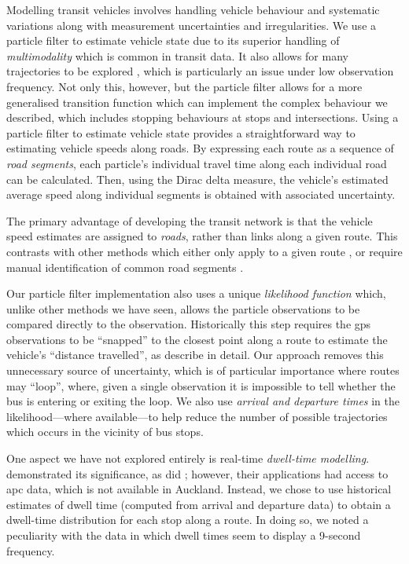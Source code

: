 Modelling transit vehicles involves handling vehicle behaviour and systematic variations along with measurement uncertainties and irregularities. We use a particle filter to estimate vehicle state due to its superior handling of \emph{multimodality} which is common in transit data. It also allows for many trajectories to be explored \citep{Hans_2015}, which is particularly an issue under low observation frequency. Not only this, however, but the particle filter allows for a more generalised transition function which can implement the complex behaviour we described, which includes stopping behaviours at stops and intersections. Using a particle filter to estimate vehicle state provides a straightforward way to estimating vehicle speeds along roads. By expressing each route as a sequence of \emph{road segments}, each particle's individual travel time along each individual road can be calculated. Then, using the Dirac delta measure, the vehicle's estimated average speed along individual segments is obtained with associated uncertainty.


The primary advantage of developing the transit network is that the vehicle speed estimates are assigned to \emph{roads}, rather than links along a given route. This contrasts with other methods which either only apply to a given route \citep{Yu_2010,Celan_2017,Chang_2010}, or require manual identification of common road segments \citep{Yu_2011,Yin_2017}.


Our particle filter implementation also uses a unique \emph{likelihood function} which, unlike other methods we have seen, allows the particle observations to be compared directly to the observation. Historically this step requires the \gls{gps} observations to be ``snapped'' to the closest point along a route to estimate the vehicle's ``distance travelled'', as \citet{Cathey_2003} describe in detail. Our approach removes this unnecessary source of uncertainty, which is of particular importance where routes may ``loop'', where, given a single observation it is impossible to tell whether the bus is entering or exiting the loop. We also use \emph{arrival and departure times} in the likelihood---where available---to help reduce the number of possible trajectories which occurs in the vicinity of bus stops.


One aspect we have not explored entirely is real-time \emph{dwell-time modelling}. \citet{Shalaby_2004} demonstrated its significance, as did \citet{Hans_2015}; however, their applications had access to \gls{apc} data, which is not available in Auckland. Instead, we chose to use historical estimates of dwell time (computed from arrival and departure data) to obtain a dwell-time distribution for each stop along a route. In doing so, we noted a peculiarity with the data in which dwell times seem to display a 9-second frequency.


